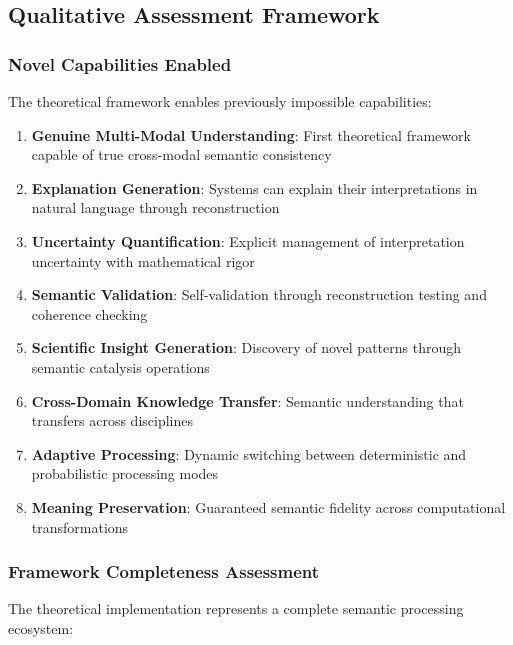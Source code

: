 \documentclass[12pt,a4paper,twoside]{article}
\begin{document}
\subsection{Qualitative Assessment Framework}

\subsubsection{Novel Capabilities Enabled}

The theoretical framework enables previously impossible capabilities:

\begin{enumerate}
\item \textbf{Genuine Multi-Modal Understanding}: First theoretical framework capable of true cross-modal semantic consistency
\item \textbf{Explanation Generation}: Systems can explain their interpretations in natural language through reconstruction
\item \textbf{Uncertainty Quantification}: Explicit management of interpretation uncertainty with mathematical rigor
\item \textbf{Semantic Validation}: Self-validation through reconstruction testing and coherence checking
\item \textbf{Scientific Insight Generation}: Discovery of novel patterns through semantic catalysis operations
\item \textbf{Cross-Domain Knowledge Transfer}: Semantic understanding that transfers across disciplines
\item \textbf{Adaptive Processing}: Dynamic switching between deterministic and probabilistic processing modes
\item \textbf{Meaning Preservation}: Guaranteed semantic fidelity across computational transformations
\end{enumerate}

\subsubsection{Framework Completeness Assessment}

The theoretical implementation represents a complete semantic processing ecosystem:
\end{document}
